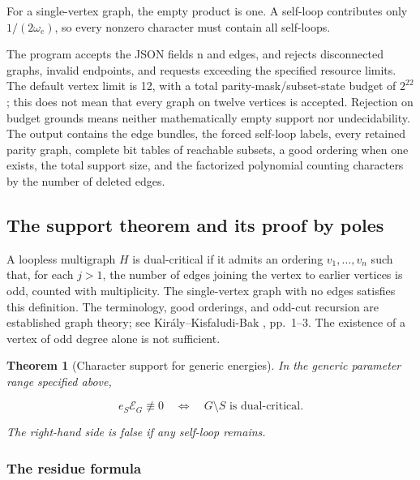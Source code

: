 \documentclass[11pt,a4paper,oneside]{article}
\theoremstyle{plain}
\newtheorem{theorem}{Theorem}[section]
\theoremstyle{definition}
\theoremstyle{remark}
\numberwithin{equation}{section}
\begin{document}
For a single-vertex graph, the empty product is one. A self-loop contributes only \(1/(2\omega_e)\), so every nonzero character must contain all self-loops.

The program accepts the JSON fields n and edges, and rejects disconnected graphs, invalid endpoints, and requests exceeding the specified resource limits. The default vertex limit is 12, with a total parity-mask/subset-state budget of \(2^{22}\); this does not mean that every graph on twelve vertices is accepted. Rejection on budget grounds means neither mathematically empty support nor undecidability. The output contains the edge bundles, the forced self-loop labels, every retained parity graph, complete bit tables of reachable subsets, a good ordering when one exists, the total support size, and the factorized polynomial counting characters by the number of deleted edges.


\subsection{The support theorem and its proof by poles}\label{sec:graph:2}

A loopless multigraph \(H\) is dual-critical if it admits an ordering \(v_1,\ldots,v_n\) such that, for each \(j>1\), the number of edges joining the vertex to earlier vertices is odd, counted with multiplicity. The single-vertex graph with no edges satisfies this definition. The terminology, good orderings, and odd-cut recursion are established graph theory; see Király--Kisfaludi-Bak \cite{dualcritical}, pp.~1--3. The existence of a vertex of odd degree alone is not sufficient.

\begin{theorem}[Character support for generic energies]

\label{thm:graph:1} In the generic parameter range specified above,

\begin{equation}
e_S\mathscr E_G\not\equiv0
 \quad\Longleftrightarrow\quad G\setminus S\text{ is dual-critical}.       \label{eq:graph:2}
\end{equation}

The right-hand side is false if any self-loop remains.

\end{theorem}

\subsubsection{The residue formula}\label{sec:graph:2.1}
\end{document}
